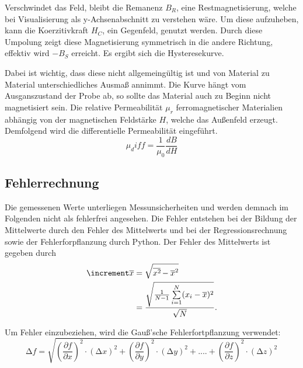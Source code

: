 Verschwindet das Feld, bleibt die Remanenz $B_R$, eine Restmagnetisierung, welche 
bei Visualisierung als y-Achsenabschnitt zu verstehen wäre. Um diese aufzuheben,
kann die Koerzitivkraft $H_C$, ein Gegenfeld, genutzt werden. Durch diese Umpolung 
zeigt diese Magnetisierung symmetrisch in die andere Richtung, effektiv wird 
$-B_S$ erreicht. Es ergibt sich die Hysteresekurve.

Dabei ist wichtig, dass diese nicht allgemeingültig ist und von Material zu 
Material unterschiedliches Ausmaß annimmt. Die Kurve hängt vom Ausganszustand
der Probe ab, so sollte das Material auch zu Beginn nicht magnetisiert sein.
Die relative Permeabilität $\mu_r$ ferromagnetischer Materialien abhängig von 
der magnetischen Feldstärke $H$, welche das Außenfeld erzeugt. Demfolgend wird 
die differentielle Permeabilität eingeführt.
\begin{equation}
    \label{eqn:10}
    \mu_diff = \frac{1}{\mu_0} \frac{dB}{dH}
\end{equation}

\subsection{Fehlerrechnung}
Die gemessenen Werte unterliegen Messunsicherheiten und werden demnach im
Folgenden nicht als fehlerfrei angesehen. Die Fehler entstehen bei der
Bildung der Mittelwerte durch den Fehler des Mittelwerts und bei der
Regressionsrechnung sowie der Fehlerforpflanzung durch Python.
Der Fehler des Mittelwerts ist gegeben durch 
\begin{equation}
    \begin{aligned}
        \increment \overline{x} &= \sqrt{\overline{x^2\kern-0.1em} - \overline{x}^2} \\
                            &= \frac{\sqrt{\frac{1}{N-1} \sum\limits_{i=1}^N (x_i - \overline{x})^2}}{\sqrt{N}}.
    \end{aligned}
\end{equation}

Um Fehler einzubeziehen, wird die Gauß'sche Fehlerfortpflanzung verwendet:
\begin{equation}
    \label{eqn:9}
    \increment f = \sqrt{\left(\frac{\partial f}{\partial x}\right)^2 \cdot \left(\increment x\right)^2 + \left(\frac{\partial f}{\partial y}\right)^2 \cdot \left(\increment y\right)^2 + .... + \left(\frac{\partial f}{\partial z}\right)^2 \cdot \left(\increment z\right)^2}
\end{equation}